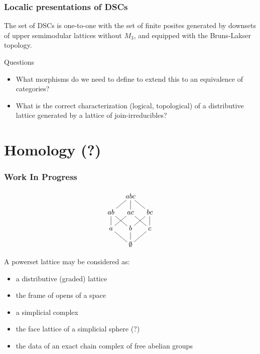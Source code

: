 \documentclass{beamer}
\begin{document}
\begin{frame}
\frametitle{Localic presentations of DSCs}

\begin{theorem}
The set of DSCs is one-to-one with the set of finite posites generated by downsets of upper semimodular lattices without \(M_3\), and equipped with the Bruns-Lakser topology.
\end{theorem}

Questions
\begin{itemize}
\item What morphisms do we need to define to extend this to an equivalence of categories?
\item What is the correct characterization (logical, topological) of a distributive lattice generated by a lattice of join-irreducibles?
\end{itemize}

\end{frame}

\section{Homology (?)}
\begin{frame}
\frametitle{Work In Progress}

\begin{figure}
\begin{equation*}
    \xymatrix@=1em{& abc \ar@{-}[dl] \ar@{-}[d] \ar@{-}[dr] & \\
      ab \ar@{-}[d] \ar@{-}[dr] & ac \ar@{-}[dl] \ar@{-}[dr] &
        bc \ar@{-}[d] \ar@{-}[dl] \\
      a \ar@{-}[dr] & b \ar@{-}[d] & c \ar@{-}[dl] \\
       & \emptyset &}
\end{equation*}
\end{figure}

A powerset lattice may be considered as:
\begin{itemize}
\item a distributive (graded) lattice
\item the frame of opens of a space
\item a simplicial complex
\item the face lattice of a simplicial sphere (?)
\item the data of an exact chain complex of free abelian groups
\end{itemize} 
\end{frame}
\end{document}
